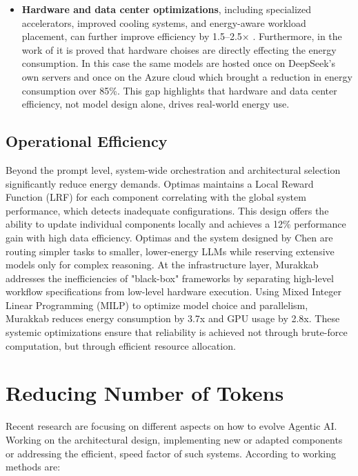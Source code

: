 \documentclass[10pt,twocolumn,letterpaper]{article}
\begin{document}
\begin{itemize}
    \item \textbf{Hardware and data center optimizations}, including specialized accelerators, improved cooling systems, and energy-aware workload placement, can further improve efficiency by 1.5--2.5$\times$ \citep{Oviedo_Kazhamiaka_Choukse_Kim_Luers_Nakagawa_Bianchini_Ferres_2025}. Furthermore, in the work of \citep{Jegham_Abdelatti_Elmoubarki_Hendawi_2025} it is proved that hardware choises are directly effecting the energy consumption. In this case the same models are hosted once on DeepSeek’s own servers and once on the Azure cloud which brought a reduction in energy consumption over 85\%. This gap highlights that hardware and data center efficiency, not model design alone, drives real-world energy use.
\end{itemize}

\subsection{Operational Efficiency}
Beyond the prompt level, system-wide orchestration and architectural selection significantly reduce energy demands. Optimas \citep{Wu_Sarthi_Zhao_Lee_Shandilya_Grobelnik_Choudhary_Huang_Subbian_Zhang_et_al._2025} maintains a Local Reward Function (LRF) for each component correlating with the global system performance, which detects inadequate configurations. This design offers the ability to update individual components locally and achieves a 12\% performance gain with high data efficiency. Optimas and the system designed by Chen \citep{Chen_Davis_Hanin_Bailis_Zaharia_Zou_Stoica_2025} are routing simpler tasks to smaller, lower-energy LLMs while reserving extensive models only for complex reasoning. At the infrastructure layer, Murakkab \citep{Chaudhry_2025} addresses the inefficiencies of "black-box" frameworks by separating high-level workflow specifications from low-level hardware execution. Using Mixed Integer Linear Programming (MILP) to optimize model choice and parallelism, Murakkab reduces energy consumption by 3.7x and GPU usage by 2.8x. These systemic optimizations ensure that reliability is achieved not through brute-force computation, but through efficient resource allocation. 


\section{Reducing Number of Tokens}

Recent research are focusing on different aspects on how to evolve Agentic AI. Working on the architectural design, implementing new or adapted components or addressing the efficient, speed factor of such systems. According to \citep{Xu_2026} working methods are:
\end{document}

